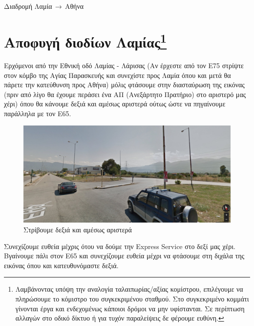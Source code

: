 \begin{center}
\begin{huge}
Διαδρομή Λαμία$\,\to\,$Αθήνα
\end{huge}
\section*{Αποφυγή διοδίων Λαμίας\footnote{Λαμβάνοντας υπόψη την αναλογία ταλαιπωρίας/αξίας κομίστρου, επιλέγουμε να πληρώσουμε το κόμιστρο του συγκεκριμένου σταθμού. Στο συγκεκριμένο κομμάτι γίνονται έργα και ενδεχομένως κάποιοι δρόμοι να μην υφίστανται. Σε περίπτωση αλλαγών στο οδικό δίκτυο ή για τυχόν παραλείψεις δε φέρουμε ευθύνη.}}
\end{center}
Ερχόμενοι από την Εθνική οδό Λαμίας - Λάρισας (Αν έρχεστε από τον Ε75 στρίψτε στον κόμβο της Αγίας Παρασκευής και συνεχίστε προς Λαμία όπου και μετά θα πάρετε την κατεύθυνση προς Αθήνα) μόλις φτάσουμε στην διασταύρωση της εικόνας (πριν από λίγο θα έχουμε περάσει ένα ΑΠ (Ανεξάρτητο Πρατήριο) στο αριστερό μας χέρι) όπου θα κάνουμε δεξιά και αμέσως αριστερά ούτως ώστε να πηγαίνουμε παράλληλα με τον Ε65.
\begin{figure}[H]
\includegraphics[width=\textwidth]{images/lamia-athina/lamia/lamia_001.jpg}
\caption{Στρίβουμε δεξιά και αμέσως αριστερά} 
\end{figure}

Συνεχίζουμε ευθεία μέχρις ότου να δούμε την Express Service στο δεξί μας χέρι. Βγαίνουμε πάλι στον Ε65 και συνεχίζουμε ευθεία μέχρι να φτάσουμε στη διχάλα της εικόνας όπου και κατευθυνόμαστε δεξιά.
 
